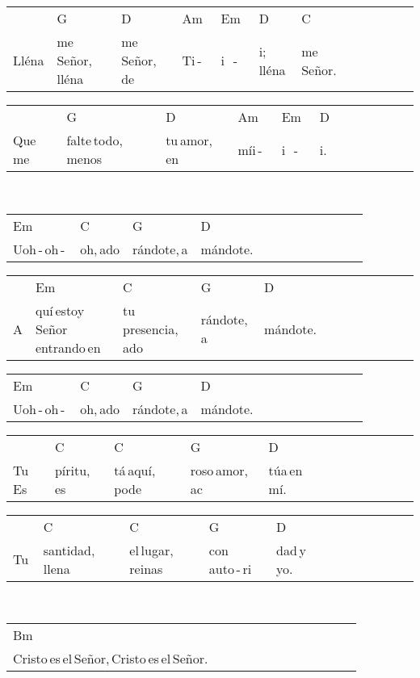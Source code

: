 \begin{multicols}{2}
\begin{minipage}{\columnwidth}
\noindent
\begin{tabular}{llllllllllll}
&G&D&Am&Em&D&C\\
Lléna&me\,Señor,\,lléna&me\,Señor,\,de\,&Ti\,-\,\,\,&i\,\,\,\,-\,\,\,\,&i;\,lléna&me\,Señor.
\end{tabular}

\noindent
\begin{tabular}{llllllllllll}
&G&D&Am&Em&D\\
Que\,me\,&falte\,todo,\,menos\,&tu\,amor,\,en\,&míi\,-\,\,\,&i\,\,\,\,-\,\,\,\,&i.
\end{tabular}
\end{minipage}\\

\noindent
\begin{minipage}{\columnwidth}
\noindent
\noindent
\begin{tabular}{llllllllllll}
Em&C&G&D\\
Uoh\,-\,oh\,-\,&oh,\,ado&rándote,\,a&mándote.
\end{tabular}

\noindent
\begin{tabular}{llllllllllll}
&Em&C&G&D\\
A&quí\,estoy\,Señor\,entrando\,en\,&tu\,presencia,\,ado&rándote,\,a&mándote.
\end{tabular}

\noindent
\begin{tabular}{llllllllllll}
Em&C&G&D\\
Uoh\,-\,oh\,-\,&oh,\,ado&rándote,\,a&mándote.
\end{tabular}

\noindent
\begin{tabular}{llllllllllll}
&C&C&G&D\\
Tu\,Es&píritu,\,es&tá\,aquí,\,pode&roso\,amor,\,ac&túa\,en\,mí.
\end{tabular}

\noindent
\begin{tabular}{llllllllllll}
&C&C&G&D\\
Tu\,&santidad,\,llena\,&el\,lugar,\,reinas\,&con\,auto\,-\,ri&dad\,y\,yo.
\end{tabular}
\end{minipage}\\

\noindent
\begin{minipage}{\columnwidth}
\noindent
\noindent
\begin{tabular}{llllllllllll}
Bm\\
Cristo\,es\,el\,Señor,\,Cristo\,es\,el\,Señor.
\end{tabular}


\end{minipage}
\end{multicols}
